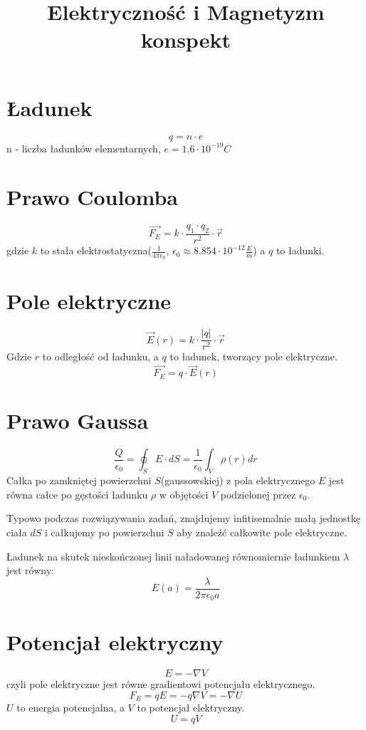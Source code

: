 \documentclass{../konspekt}
\title{Elektryczność i Magnetyzm konspekt}
\begin{document}
\begin{multicols}{2}

  \section{Ładunek}

  $$
  q = n \cdot e
  $$
  n - liczba ładunków elementarnych, $e = 1.6 \cdot 10^{-19} C$

  \section{Prawo Coulomba}

  $$
  \vec{F_E} = k \cdot \frac{q_1 \cdot q_2}{r^2} \cdot \vec{r}
  $$
  gdzie $k$ to stała elektrostatyczna($\frac{1}{4\pi\epsilon_0}$,
  $\epsilon_0\approx8.854\cdot10^{-12}\frac{E}{m}$) a $q$ to ładunki.

  \section{Pole elektryczne}

  $$
  \vec{E}(r) = k \cdot \frac{|q|}{r^2} \cdot \vec{r}
  $$
  Gdzie $r$ to odległość od ładunku, a $q$ to ładunek, tworzący pole
  elektryczne.
  $$
  \vec{F_E} = q \cdot \vec{E}(r)
  $$

  \section{Prawo Gaussa}

  $$
  \frac{Q}{\epsilon_0} = \oint_S E \cdot dS = \frac{1}{\epsilon_0}
  \int_V \rho(r) dr
  $$
  Całka po zamkniętej powierzchni $S$(gaussowskiej) z pola
  elektrycznego $E$ jest równa całce po gęstości ładunku $\rho$ w
  objętości $V$ podzielonej przez $\epsilon_0$.

  Typowo podczas rozwiązywania zadań, znajdujemy infitisemalnie małą jednostkę
  ciała $dS$ i całkujemy po powierzchni $S$ aby znaleźć całkowite pole
  elektryczne.

  Ładunek na skutek nieskończonej linii naładowanej równomiernie
  ładunkiem $\lambda$ jest równy:
  $$
  E(a) = \frac{\lambda}{2\pi\epsilon_0 a}
  $$

  \section{Potencjał elektryczny}

  $$
  E = - \nabla V
  $$
  czyli pole elektryczne jest równe gradientowi potencjału
  elektrycznego.
  $$
  F_E = qE = -q \nabla V = - \nabla U
  $$
  $U$ to energia potencjalna, a $V$ to potencjał elektryczny.
  $$
  U = qV
  $$


\end{multicols}
\end{document}
